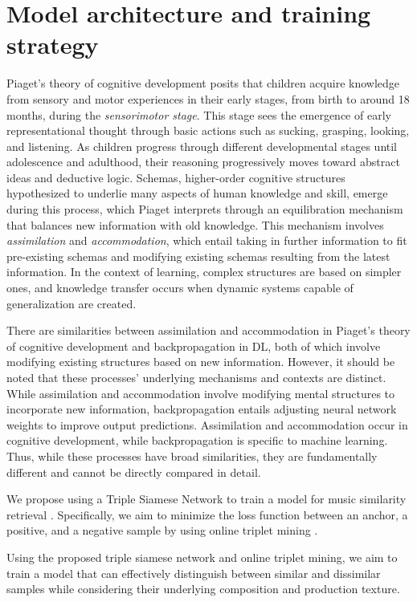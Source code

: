 \section{Model architecture and training strategy}
Piaget's theory of cognitive development \cite{Huitt2003PiagetsDevelopment} posits that children acquire knowledge from sensory and motor experiences in their early stages, from birth to around 18 months, during the \textit{sensorimotor stage}. This stage sees the emergence of early representational thought through basic actions such as sucking, grasping, looking, and listening. As children progress through different developmental stages until adolescence and adulthood, their reasoning progressively moves toward abstract ideas and deductive logic. Schemas, higher-order cognitive structures hypothesized to underlie many aspects of human knowledge and skill, emerge during this process, which Piaget interprets through an equilibration mechanism that balances new information with old knowledge. This mechanism involves \textit{assimilation} and \textit{accommodation}, which entail taking in further information to fit pre-existing schemas and modifying existing schemas resulting from the latest information. In the context of learning, complex structures are based on simpler ones, and knowledge transfer occurs when dynamic systems capable of generalization are created. \cite{audioselfsupsurvey}

There are similarities between assimilation and accommodation in Piaget's theory of cognitive development and backpropagation in DL, both of which involve modifying existing structures based on new information. However, it should be noted that these processes' underlying mechanisms and contexts are distinct. While assimilation and accommodation involve modifying mental structures to incorporate new information, backpropagation entails adjusting neural network weights to improve output predictions. Assimilation and accommodation occur in cognitive development, while backpropagation is specific to machine learning. Thus, while these processes have broad similarities, they are fundamentally different and cannot be directly compared in detail.

We propose using a Triple Siamese Network to train a model for music similarity retrieval \cite{contentmusicsimtriplet2020}. Specifically, we aim to minimize the loss function between an anchor, a positive, and a negative sample by using online triplet mining \cite{Sikaroudi2020OfflinePatches}.

Using the proposed triple siamese network and online triplet mining, we aim to train a model that can effectively distinguish between similar and dissimilar samples while considering their underlying composition and production texture.

